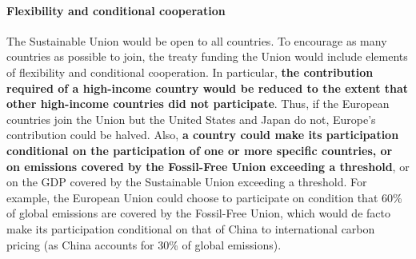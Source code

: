 \documentclass[12pt,english]{article}
\begin{document}
\paragraph{Flexibility and conditional cooperation}
The Sustainable Union would be open to all countries. To encourage as many countries as possible to join, the treaty funding the Union would include elements of flexibility and conditional cooperation. In particular, \textbf{the contribution required of a high-income country would be reduced to the extent that other high-income countries did not participate}. Thus, if the European countries join the Union but the United States and Japan do not, Europe's contribution could be halved. Also, %
\textbf{a country could make its participation conditional on the participation of one or more specific countries, or on emissions covered by the Fossil-Free Union exceeding a threshold}, or on the GDP covered by the Sustainable Union exceeding a threshold. For example, the European Union could choose to participate on condition that 60\% of global emissions are covered by the Fossil-Free Union, which would de facto make its participation conditional on that of China to international carbon pricing (as China accounts for 30\% of global emissions). 
\end{document}
